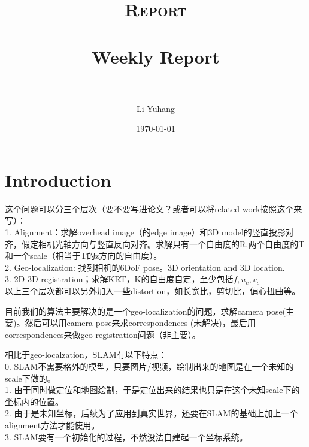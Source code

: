 \documentclass[paper=a4, fontsize=11pt]{scrartcl} %
\title{	
\normalfont \normalsize
\textsc{Report} \\ [25pt] %
\horrule{0.5pt} \\[0.4cm] %
\huge Weekly Report \\ %
\horrule{2pt} \\[0.5cm] %
}
\author{Li Yuhang} %
\date{\normalsize\today} %
\numberwithin{equation}{section} %
\numberwithin{figure}{section} %
\numberwithin{table}{section} %
\begin{document}
\maketitle %
\section{Introduction}
{这个问题可以分三个层次（要不要写进论文？或者可以将related work按照这个来写）：\\
	1. Alignment：求解overhead image（的edge image）和3D model的竖直投影对齐，假定相机光轴方向与竖直反向对齐。求解只有一个自由度的R,两个自由度的T和一个scale（相当于T的z方向的自由度）。\\
	2. Geo-localization: 找到相机的6DoF pose。3D orientation and 3D location.\\
	3. 2D-3D registration；求解KRT，K的自由度自定，至少包括$f,u_c,v_c$\\
	以上三个层次都可以另外加入一些distortion，如长宽比，剪切比，偏心扭曲等。\\
}

{目前我们的算法主要解决的是一个geo-localization的问题，求解camera pose(主要)。然后可以用camera pose来求correspondences (未解决)，最后用correspondences来做geo-registration问题（非主要）。}

{相比于geo-localzation，SLAM有以下特点：\\
	0. SLAM不需要格外的模型，只要图片/视频，绘制出来的地图是在一个未知的scale下做的。\\
	1. 由于同时做定位和地图绘制，于是定位出来的结果也只是在这个未知scale下的坐标内的位置。\\
	2. 由于是未知坐标，后续为了应用到真实世界，还要在SLAM的基础上加上一个alignment方法才能使用。\\
	3. SLAM要有一个初始化的过程，不然没法自建起一个坐标系统。\\}
%
\end{document}
